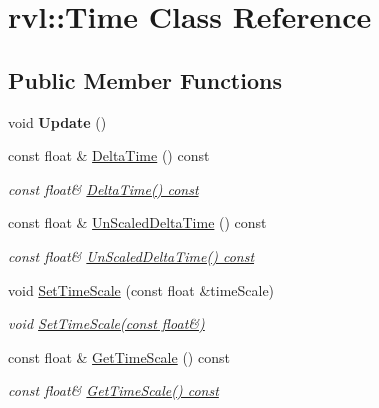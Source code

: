 \hypertarget{classrvl_1_1_time}{}\section{rvl\+:\+:Time Class Reference}
\label{classrvl_1_1_time}
\subsection*{Public Member Functions}
\begin{DoxyCompactItemize}
\item 
\mbox{\label{classrvl_1_1_time_ad22605375fc2a775f10fb80242fab9a7}} 
void {\bfseries Update} ()
\item 
const float \& \hyperlink{classrvl_1_1_time_a615b7d43aa2832dd6ffb235de22044cc}{Delta\+Time} () const
\begin{DoxyCompactList}\small\item\em const float\& \hyperlink{classrvl_1_1_time_a615b7d43aa2832dd6ffb235de22044cc}{Delta\+Time() const} \end{DoxyCompactList}\item 
const float \& \hyperlink{classrvl_1_1_time_a2edf11a18558efa227b3170eae433b3c}{Un\+Scaled\+Delta\+Time} () const
\begin{DoxyCompactList}\small\item\em const float\& \hyperlink{classrvl_1_1_time_a2edf11a18558efa227b3170eae433b3c}{Un\+Scaled\+Delta\+Time() const} \end{DoxyCompactList}\item 
void \hyperlink{classrvl_1_1_time_a6033a29cb79140a95337f78fe3de4f8a}{Set\+Time\+Scale} (const float \&time\+Scale)
\begin{DoxyCompactList}\small\item\em void \hyperlink{classrvl_1_1_time_a6033a29cb79140a95337f78fe3de4f8a}{Set\+Time\+Scale(const float\&)} \end{DoxyCompactList}\item 
const float \& \hyperlink{classrvl_1_1_time_adc601517b317a98bc72a1dd87826ae4e}{Get\+Time\+Scale} () const
\begin{DoxyCompactList}\small\item\em const float\& \hyperlink{classrvl_1_1_time_adc601517b317a98bc72a1dd87826ae4e}{Get\+Time\+Scale() const} \end{DoxyCompactList}\end{DoxyCompactItemize}


